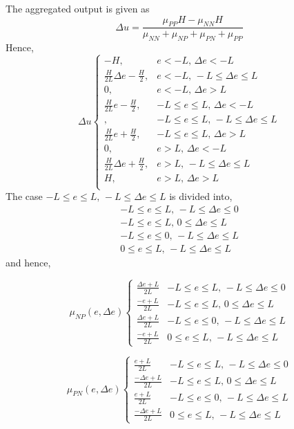 The aggregated output is given as 
\begin{equation}
    \Delta u =\frac{\mu_{PP}H-\mu_{NN}H}{\mu_{NN}+\mu_{NP}+\mu_{PN}+\mu_{PP}}
\end{equation}
Hence,
\begin{equation}
\Delta u\begin{cases}
    -H,& e<-L,\,\Delta e<-L\\
    \frac{H}{2L}\Delta e-\frac{H}{2},& e<-L,\,-L\leq \Delta e\leq L\\
    0,& e<-L,\,\Delta e>L\\
    \frac{H}{2L}e-\frac{H}{2},& -L\leq e\leq L,\,\Delta e<-L\\
    ,& -L\leq e\leq L,\,-L\leq \Delta e\leq L\\
    \frac{H}{2L}e+\frac{H}{2},& -L\leq e\leq L,\,\Delta e>L\\
    0,& e>L,\,\Delta e<-L\\
    \frac{H}{2L}\Delta e+\frac{H}{2},& e>L,\,-L\leq \Delta e\leq L\\
    H,& e>L,\,\Delta e>L\\
\end{cases}
\end{equation}
The case $-L\leq e\leq L,\,-L\leq \Delta e\leq L$ is divided into,
\begin{equation}
\begin{split}
    -L\leq e\leq L,\,-L\leq \Delta e\leq 0 \\
    -L\leq e\leq L,\,0\leq \Delta e\leq L \\
    -L\leq e\leq 0,\,-L\leq \Delta e\leq L \\
    0\leq e\leq L,\,-L\leq \Delta e\leq L 
\end{split}
\end{equation}
and hence,


\begin{equation}
\mu_{NP}(e,\Delta e)\begin{cases}
    \frac{\Delta e+L}{2L} & -L\leq e\leq L,\,-L\leq \Delta e\leq 0 \\
    \frac{-e+L}{2L} & -L\leq e\leq L,\,0\leq \Delta e\leq L \\
    \frac{\Delta e+L}{2L} & -L\leq e\leq 0,\,-L\leq \Delta e\leq L \\
    \frac{-e+L}{2L} & 0\leq e\leq L,\,-L\leq \Delta e\leq L 
\end{cases}
\end{equation}

\begin{equation}
\mu_{PN}(e,\Delta e)\begin{cases}
    \frac{e+L}{2L} & -L\leq e\leq L,\,-L\leq \Delta e\leq 0 \\
    \frac{-\Delta e+L}{2L} & -L\leq e\leq L,\,0\leq \Delta e\leq L \\
    \frac{e+L}{2L} & -L\leq e\leq 0,\,-L\leq \Delta e\leq L \\
    \frac{-\Delta e+L}{2L}& 0\leq e\leq L,\,-L\leq \Delta e\leq L 
\end{cases}
\end{equation}

